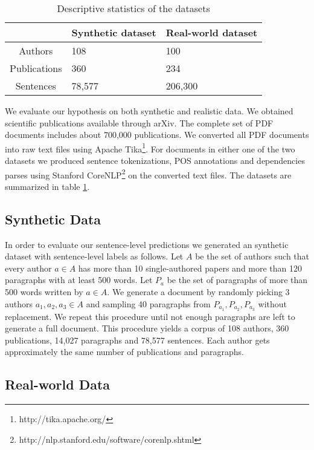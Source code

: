 
\begin{table}[t]
\begin{center}
\begin{tabular}{c p{1.5cm} p{2.5cm}}
 \hline
& \textbf{Synthetic dataset} & \textbf{Real-world dataset} \\ \hline
Authors & 108 & 100 \\
Publications & 360 & 234 \\
Sentences & 78,577 & 206,300 \\
 \hline
\end{tabular}
\end{center}
\caption{Descriptive statistics of the datasets}
\label{table:data}
\end{table}%

We evaluate our hypothesis on both synthetic and realistic data. We obtained scientific publications available through arXiv. The complete set of PDF documents includes about 700,000 publications. We converted all PDF documents into raw text files using Apache Tika\footnote{http://tika.apache.org/}. For documents in either one of the two datasets we produced sentence tokenizations, POS annotations and dependencies parses using Stanford CoreNLP\footnote{http://nlp.stanford.edu/software/corenlp.shtml} on the converted text files. The datasets are summarized in table \ref{table:data}.

\subsection{Synthetic Data}

In order to evaluate our sentence-level predictions we generated an synthetic dataset with sentence-level labels as follows. Let $A$ be the set of authors such that every author $a \in A$ has more than 10 single-authored papers and more than 120 paragraphs with at least 500 words. Let $P_a$ be the set of paragraphs of more than 500 words written by $a \in A$. We generate a document by randomly picking 3 authors $a_1, a_2, a_3 \in A$ and sampling 40 paragraphs from $P_{a_1}, P_{a_2}, P_{a_3}$ without replacement. We repeat this procedure until not enough paragraphs are left to generate a full document. This procedure yields a corpus of 108 authors, 360 publications, 14,027 paragraphs and 78,577 sentences.  Each author gets approximately the same number of publications and paragraphs.

\subsection{Real-world Data}

